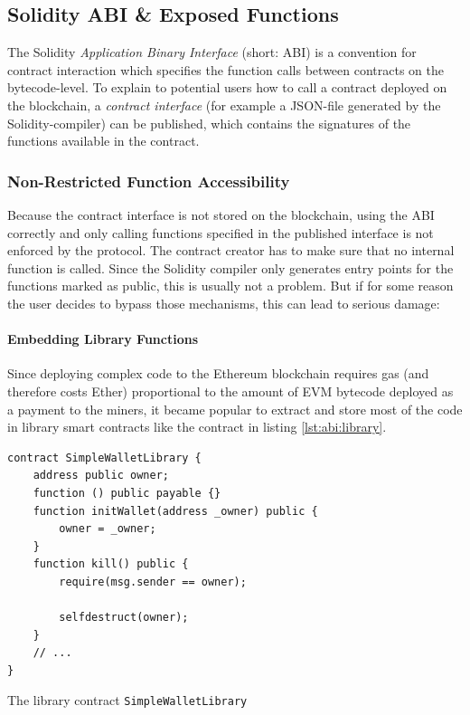 \subsection{Solidity ABI \& Exposed Functions}
The Solidity \textit{Application Binary Interface} (short: ABI) is a convention for contract interaction which specifies the function calls between contracts on the bytecode-level. To explain to potential users how to call a contract deployed on the blockchain, a \textit{contract interface} (for example a JSON-file generated by the Solidity-compiler) can be published, which contains the signatures of the functions available in the contract.

\subsubsection{Non-Restricted Function Accessibility}
Because the contract interface is not stored on the blockchain, using the ABI correctly and only calling functions specified in the published interface is not enforced by the protocol. The contract creator has to make sure that no internal function is called. Since the Solidity compiler only generates entry points for the functions marked as public, this is usually not a problem. But if for some reason the user decides to bypass those mechanisms, this can lead to serious damage:

\paragraph{Embedding Library Functions} Since deploying complex code to the Ethereum blockchain requires gas (and therefore costs Ether) proportional to the amount of EVM bytecode deployed as a payment to the miners, it became popular to extract and store most of the code in library smart contracts like the contract in listing \ref{lst:abi:library}.

\begin{listing}[H]
	\begin{verbatim}
contract SimpleWalletLibrary { 
    address public owner;
    function () public payable {}
    function initWallet(address _owner) public {
        owner = _owner;
    }
    function kill() public {
        require(msg.sender == owner);

        selfdestruct(owner);
    }
    // ...
}
    \end{verbatim}
	\caption{The library contract \texttt{SimpleWalletLibrary}}
	\label{lst:abi:library}
\end{listing}


